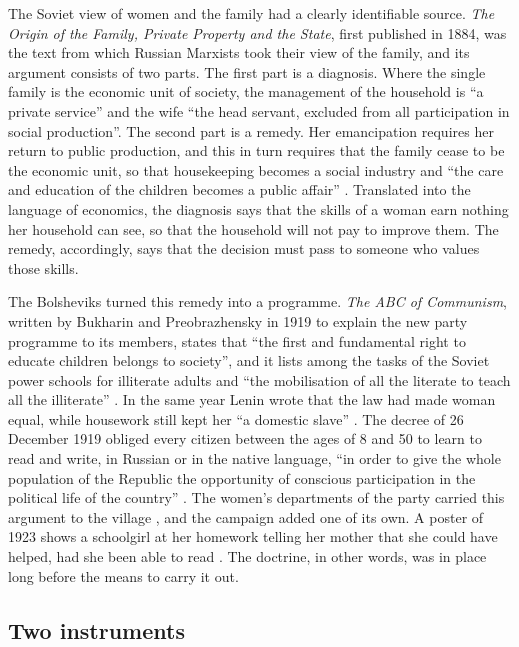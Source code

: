 \documentclass[12pt]{article}
\begin{document}
The Soviet view of women and the family had a clearly identifiable source. \emph{The Origin of the Family, Private Property and the State}, first published in 1884, was the text from which Russian Marxists took their view of the family, and its argument consists of two parts. The first part is a diagnosis. Where the single family is the economic unit of society, the management of the household is ``a private service'' and the wife ``the head servant, excluded from all participation in social production''. The second part is a remedy. Her emancipation requires her return to public production, and this in turn requires that the family cease to be the economic unit, so that housekeeping becomes a social industry and ``the care and education of the children becomes a public affair'' \citep[ch.~2]{engels1884}. Translated into the language of economics, the diagnosis says that the skills of a woman earn nothing her household can see, so that the household will not pay to improve them. The remedy, accordingly, says that the decision must pass to someone who values those skills.

The Bolsheviks turned this remedy into a programme. \emph{The ABC of Communism}, written by Bukharin and Preobrazhensky in 1919 to explain the new party programme to its members, states that ``the first and fundamental right to educate children belongs to society'', and it lists among the tasks of the Soviet power schools for illiterate adults and ``the mobilisation of all the literate to teach all the illiterate'' \citep[\S\S 79 and 84, my translation]{bukharin1919}. In the same year Lenin wrote that the law had made woman equal, while housework still kept her ``a domestic slave'' \citep{lenin1919}. The decree of 26 December 1919 obliged every citizen between the ages of 8 and 50 to learn to read and write, in Russian or in the native language, ``in order to give the whole population of the Republic the opportunity of conscious participation in the political life of the country'' \citep{snk1919}. The women's departments of the party carried this argument to the village \citep{wood1997,goldman1993}, and the campaign added one of its own. A poster of 1923 shows a schoolgirl at her homework telling her mother that she could have helped, had she been able to read \citep{kruglikova1923}. The doctrine, in other words, was in place long before the means to carry it out.

\subsection{Two instruments}
\end{document}
